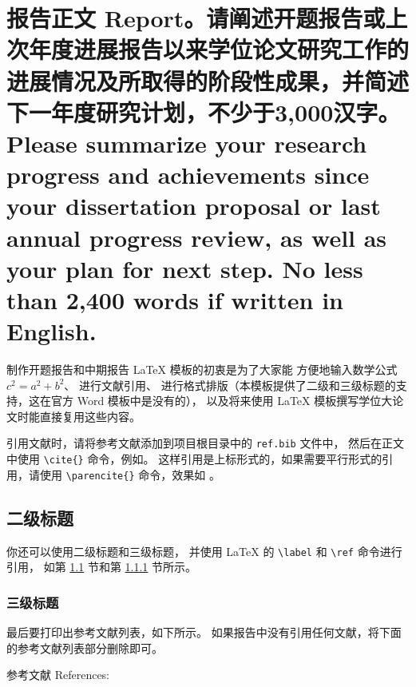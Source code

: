 \documentclass[a4paper,zihao=-4,AutoFakeBold]{ctexart}
\begin{document}
\makecover

\makeinstruction

\makeprojectinfo

\initbodyformat


\section{报告正文 Report。\mdseries 请阐述开题报告或上次年度进展报告以来学位论文研究工作的进展情况及所取得的阶段性成果，并简述下一年度研究计划，不少于3,000汉字。Please summarize your research progress and achievements since your dissertation proposal or last annual progress review, as well as your plan for next step. No less than 2,400 words if written in English.}

制作开题报告和中期报告 \LaTeX{} 模板的初衷是为了大家能
方便地输入数学公式 $c^2 = a^2 + b^2$、
进行文献引用\cite{ZJSD}、
进行格式排版（本模板提供了二级和三级标题的支持，这在官方 Word 模板中是没有的），
以及将来使用 \LaTeX{} 模板撰写学位大论文时能直接复用这些内容。


引用文献时，请将参考文献添加到项目根目录中的 \texttt{ref.bib} 文件中，
然后在正文中使用 \verb|\cite{}| 命令，例如\cite{SPDZ}。
这样引用是上标形式的，如果需要平行形式的引用，请使用
\verb|\parencite{}| 命令，效果如 \parencite{SPDZ}。


\subsection{二级标题}\label{sub}

你还可以使用二级标题和三级标题，
并使用 \LaTeX{} 的 \verb|\label| 和 \verb|\ref| 命令进行引用，
如第 \ref{sub} 节和第 \ref{subsub} 节所示。



\subsubsection{三级标题}\label{subsub}

最后要打印出参考文献列表，如下所示。
如果报告中没有引用任何文献，将下面的参考文献列表部分删除即可。


\vspace{2\baselineskip}%
{%
  \linespread{1.25}\selectfont    %
  \noindent 参考文献 References:
  \printbibliography[heading=none]
}
\end{document}
